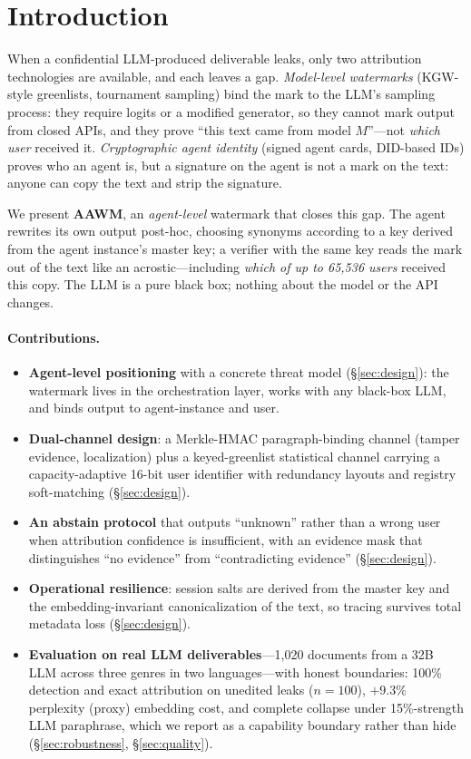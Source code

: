 \section{Introduction}
When a confidential LLM-produced deliverable leaks, only two
attribution technologies are available, and each leaves a gap. \emph{Model-level watermarks}
(KGW-style greenlists, tournament sampling) bind the mark to the LLM's
sampling process: they require logits or a modified generator, so they
cannot mark output from closed APIs, and they prove ``this text came from
model $M$''---not \emph{which user} received it. \emph{Cryptographic agent
identity} (signed agent cards, DID-based IDs) proves who an agent is, but a
signature on the agent is not a mark on the text: anyone can copy the text
and strip the signature.

We present \textbf{AAWM}, an \emph{agent-level} watermark that closes this
gap. The agent rewrites its own output post-hoc, choosing synonyms according
to a key derived from the agent instance's master key; a verifier with the
same key reads the mark out of the text like an acrostic---including
\emph{which of up to 65,536 users} received this copy. The LLM is a pure
black box; nothing about the model or the API changes.

\paragraph{Contributions.}
\begin{itemize}
\item \textbf{Agent-level positioning} with a concrete threat model
(\S\ref{sec:design}): the watermark lives in the orchestration layer, works
with any black-box LLM, and binds output to agent-instance and user.
\item \textbf{Dual-channel design}: a Merkle-HMAC paragraph-binding channel
(tamper evidence, localization) plus a keyed-greenlist statistical channel
carrying a capacity-adaptive 16-bit user identifier with redundancy
layouts and registry soft-matching (\S\ref{sec:design}).
\item \textbf{An abstain protocol} that outputs ``unknown'' rather than a
wrong user when attribution confidence is insufficient, with an evidence
mask that distinguishes ``no evidence'' from ``contradicting evidence''
(\S\ref{sec:design}).
\item \textbf{Operational resilience}: session salts are derived from the
master key and the embedding-invariant canonicalization of the text, so
tracing survives total metadata loss (\S\ref{sec:design}).
\item \textbf{Evaluation on real LLM deliverables}---1,020 documents from a
32B LLM across three genres in two languages---with honest boundaries:
100\% detection and exact attribution on unedited leaks
($n{=}100$), $+9.3\%$ perplexity (proxy) embedding cost, and complete
collapse under 15\%-strength LLM paraphrase, which we report as a
capability boundary rather than hide (\S\ref{sec:robustness},
\S\ref{sec:quality}).
\end{itemize}
